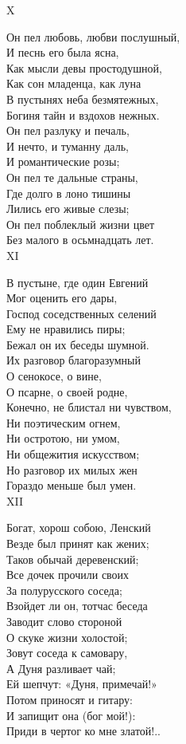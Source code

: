 X

Он пел любовь, любви послушный,\\
И песнь его была ясна,\\
Как мысли девы простодушной,\\
Как сон младенца, как луна\\
В пустынях неба безмятежных,\\
Богиня тайн и вздохов нежных.\\
Он пел разлуку и печаль,\\
И нечто, и туманну даль,\\
И романтические розы;\\
Он пел те дальные страны,\\
Где долго в лоно тишины\\
Лились его живые слезы;\\
Он пел поблеклый жизни цвет\\
Без малого в осьмнадцать лет.\\

XI

В пустыне, где один Евгений\\
Мог оценить его дары,\\
Господ соседственных селений\\
Ему не нравились пиры;\\
Бежал он их беседы шумной.\\
Их разговор благоразумный\\
О сенокосе, о вине,\\
О псарне, о своей родне,\\
Конечно, не блистал ни чувством,\\
Ни поэтическим огнем,\\
Ни остротою, ни умом,\\
Ни общежития искусством;\\
Но разговор их милых жен\\
Гораздо меньше был умен.\\

XII

Богат, хорош собою, Ленский\\
Везде был принят как жених;\\
Таков обычай деревенский;\\
Все дочек прочили своих\\
За полурусского соседа;\\
Взойдет ли он, тотчас беседа\\
Заводит слово стороной\\
О скуке жизни холостой;\\
Зовут соседа к самовару,\\
А Дуня разливает чай;\\
Ей шепчут: «Дуня, примечай!»\\
Потом приносят и гитару:\\
И запищит она (бог мой!):\\
Приди в чертог ко мне златой!..\\

